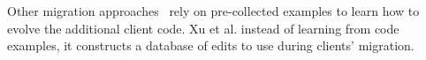  Other migration approaches~\cite{6606596,10.1145/3387905.3388608,9079197} rely on pre-collected examples to learn how to evolve the additional client code. Xu et al. \cite{8813263} instead of learning from code examples, it constructs a database of edits to use during clients' migration. %
 
